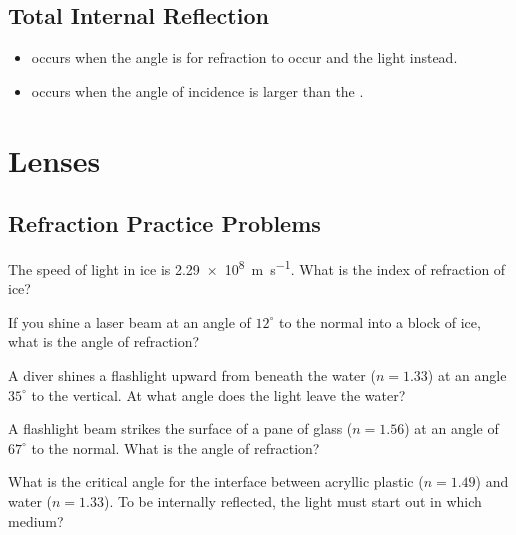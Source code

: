 \documentclass[10pt]{exam}
\begin{document}
\subsection*{Total Internal Reflection}

\begin{itemize}
  \item occurs when the angle is  for refraction to occur and the light \fillin[reflects][10em] instead.
  \item occurs when the angle of incidence is larger than the .
\end{itemize}

\vspace{2em}


\section*{Lenses}

\begin{center}


  \vs

\end{center}

\pagebreak


\subsection*{Refraction Practice Problems}

\begin{questions}
  \question 
    The speed of light in ice is \SI{2.29e8}{\meter\per\second}.  What is the index of refraction of ice?
    \vs

  \question
    If you shine a laser beam at an angle of $12^\circ$ to the normal into a block of ice, what is the angle of refraction?
    \vs

  \question
    A diver shines a flashlight upward from beneath the water ($n=1.33$) at an angle $35^\circ$ to the vertical.  At what angle does the light leave the water?
    \vs

  \question
    A flashlight beam strikes the surface of a pane of glass ($n=1.56$) at an angle of $67^\circ$ to the normal.  What is the angle of refraction?
    \vs

  \question
    What is the critical angle for the interface between acryllic plastic ($n=1.49$) and water ($n=1.33$).  To be internally reflected, the light must start out in which medium?
    \vs
 
\end{questions}
\end{document}
